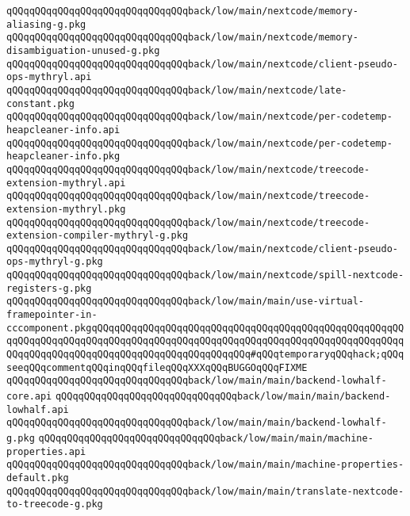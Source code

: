 \verb|qQQqqQQqqQQqqQQqqQQqqQQqqQQqqQQqback/low/main/nextcode/memory-aliasing-g.pkg|\newline
\verb|qQQqqQQqqQQqqQQqqQQqqQQqqQQqqQQqback/low/main/nextcode/memory-disambiguation-unused-g.pkg|\newline
\verb|qQQqqQQqqQQqqQQqqQQqqQQqqQQqqQQqback/low/main/nextcode/client-pseudo-ops-mythryl.api|\newline
\verb|qQQqqQQqqQQqqQQqqQQqqQQqqQQqqQQqback/low/main/nextcode/late-constant.pkg|\newline
\verb|qQQqqQQqqQQqqQQqqQQqqQQqqQQqqQQqback/low/main/nextcode/per-codetemp-heapcleaner-info.api|\newline
\verb|qQQqqQQqqQQqqQQqqQQqqQQqqQQqqQQqback/low/main/nextcode/per-codetemp-heapcleaner-info.pkg|\newline
\verb|qQQqqQQqqQQqqQQqqQQqqQQqqQQqqQQqback/low/main/nextcode/treecode-extension-mythryl.api|\newline
\verb|qQQqqQQqqQQqqQQqqQQqqQQqqQQqqQQqback/low/main/nextcode/treecode-extension-mythryl.pkg|\newline
\verb|qQQqqQQqqQQqqQQqqQQqqQQqqQQqqQQqback/low/main/nextcode/treecode-extension-compiler-mythryl-g.pkg|\newline
\verb|qQQqqQQqqQQqqQQqqQQqqQQqqQQqqQQqback/low/main/nextcode/client-pseudo-ops-mythryl-g.pkg|\newline
\verb|qQQqqQQqqQQqqQQqqQQqqQQqqQQqqQQqback/low/main/nextcode/spill-nextcode-registers-g.pkg|\newline
\verb|qQQqqQQqqQQqqQQqqQQqqQQqqQQqqQQqback/low/main/main/use-virtual-framepointer-in-cccomponent.pkgqQQqqQQqqQQqqQQqqQQqqQQqqQQqqQQqqQQqqQQqqQQqqQQqqQQqqQQqqQQqqQQqqQQqqQQqqQQqqQQqqQQqqQQqqQQqqQQqqQQqqQQqqQQqqQQqqQQqqQQqqQQqqQQqqQQqqQQqqQQqqQQqqQQqqQQqqQQqqQQqqQQqqQQq#qQQqtemporaryqQQqhack;qQQqseeqQQqcommentqQQqinqQQqfileqQQqXXXqQQqBUGGOqQQqFIXME|\newline
\verb|qQQqqQQqqQQqqQQqqQQqqQQqqQQqqQQqback/low/main/main/backend-lowhalf-core.api|\newline
\verb|qQQqqQQqqQQqqQQqqQQqqQQqqQQqqQQqback/low/main/main/backend-lowhalf.api|\newline
\verb|qQQqqQQqqQQqqQQqqQQqqQQqqQQqqQQqback/low/main/main/backend-lowhalf-g.pkg|\newline
\verb|qQQqqQQqqQQqqQQqqQQqqQQqqQQqqQQqback/low/main/main/machine-properties.api|\newline
\verb|qQQqqQQqqQQqqQQqqQQqqQQqqQQqqQQqback/low/main/main/machine-properties-default.pkg|\newline
\verb|qQQqqQQqqQQqqQQqqQQqqQQqqQQqqQQqback/low/main/main/translate-nextcode-to-treecode-g.pkg|\newline
